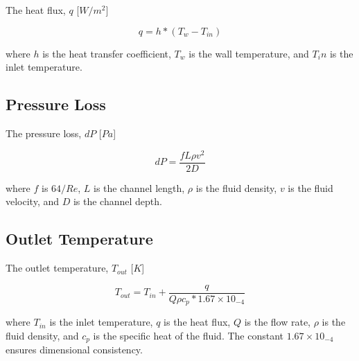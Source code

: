 \documentclass{article}
\begin{document}
The heat flux, $q$ [$W/m^2$]

\begin{equation}
	q = h * (T_w - T_{in})
\end{equation}

where $h$ is the heat transfer coefficient, $T_w$ is the wall temperature, and $T_in$ is the inlet temperature.

\subsection{Pressure Loss}

The pressure loss, $dP$ [$Pa$]

\begin{equation}
	dP = \frac{ f L \rho v^2 }{2D}
\end{equation}

where $f$ is $64/Re$, $L$ is the channel length, $\rho$ is the fluid density, $v$ is the fluid velocity, and $D$ is the channel depth.

\subsection{Outlet Temperature}

The outlet temperature, $T_{out}$ [$K$]

\begin{equation}
	T_{out} = T_{in} + \frac{q}{Q \rho c_p * 1.67 \times 10_{-4}}
\end{equation}

where $T_{in}$ is the inlet temperature, $q$ is the heat flux, $Q$ is the flow rate, $\rho$ is the fluid density, and $c_p$ is the specific heat of the fluid.  The constant $1.67 \times 10_{-4}$ ensures dimensional consistency.
\end{document}
